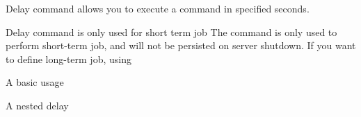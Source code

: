 Delay command allows you to execute a command in specified seconds.

\begin{note}{Delay command is only used for short term job}
    The command  is only used to perform short-term job, and will not be persisted on server shutdown.
    If you want to define long-term job, using~
\end{note}


\begin{example}{A basic usage}
\end{example}

\begin{example}{A nested delay}
\end{example}
